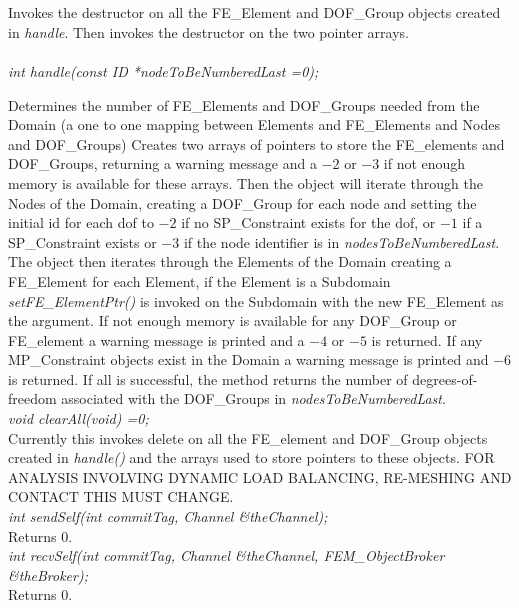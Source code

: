  \\
\\ 
Invokes the destructor on all the FE\_Element and DOF\_Group objects
created in {\em handle}. Then invokes the destructor on the two
pointer arrays. \\

\\
{\em int handle(const ID *nodeToBeNumberedLast =0);} 

Determines the number of FE\_Elements and DOF\_Groups needed from the
Domain (a one to one mapping between Elements and FE\_Elements and
Nodes and DOF\_Groups) Creates two arrays of pointers to store the
FE\_elements and DOF\_Groups, returning a warning message and a $-2$
or $-3$ if not enough memory is available for these arrays. Then the
object will iterate through the Nodes of the Domain, creating a
DOF\_Group for each node and setting the initial id for each dof to
$-2$ if no SP\_Constraint exists for the dof, or $-1$ if a
SP\_Constraint exists or $-3$ if the node identifier is in {\em
nodesToBeNumberedLast}. The object then iterates through the Elements
of the Domain creating a FE\_Element for each Element, if the Element
is a Subdomain {\em setFE\_ElementPtr()} is invoked on the Subdomain
with the new FE\_Element as the argument. If not enough memory is
available for any DOF\_Group or FE\_element a warning message is
printed and a $-4$ or $-5$ is returned. If any MP\_Constraint objects
exist in the Domain a warning message is printed and $-6$ is
returned. If all is successful, the method returns the number of
degrees-of-freedom associated with the DOF\_Groups in {\em
nodesToBeNumberedLast}. \\ 

{\em void clearAll(void) =0;} \\
Currently this invokes delete on all the FE\_element and DOF\_Group
objects created in {\em handle()} and the arrays used to store
pointers to these objects. FOR ANALYSIS INVOLVING DYNAMIC LOAD
BALANCING, RE-MESHING AND CONTACT THIS MUST CHANGE. \\

{\em int sendSelf(int commitTag, Channel \&theChannel); } \\
Returns $0$. \\

{\em int recvSelf(int commitTag, Channel \&theChannel, FEM\_ObjectBroker
\&theBroker); } \\
Returns $0$. 